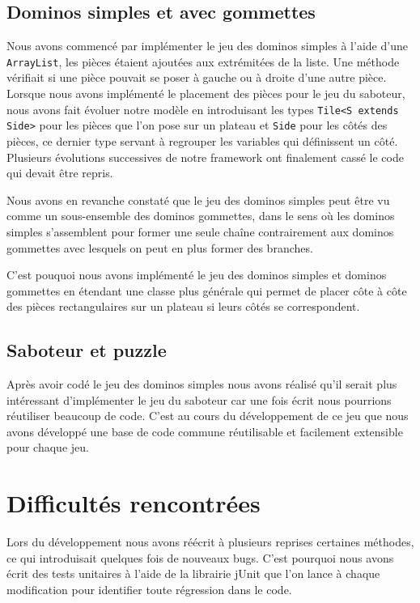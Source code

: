 \documentclass[a4paper, 11pt, DIV=9]{scrartcl}
\begin{document}
\subsection{Dominos simples et avec gommettes}
Nous avons commencé par implémenter le jeu des dominos simples à l'aide d'une
\texttt{ArrayList}, les pièces étaient ajoutées aux extrémitées de la liste. Une
méthode vérifiait si une pièce pouvait se poser à gauche ou à droite d'une autre
pièce. Lorsque nous avons implémenté le placement des pièces pour le jeu du
saboteur, nous avons fait évoluer notre modèle en introduisant les types \texttt{Tile<S
extends Side>} pour les pièces que l'on pose sur un plateau et \texttt{Side}
pour les côtés des pièces, ce dernier type servant à regrouper les variables qui
définissent un côté. Plusieurs évolutions successives de notre framework ont
finalement cassé le code qui devait être repris.

Nous avons en revanche constaté que le jeu des dominos simples peut être vu
comme un sous-ensemble des dominos gommettes, dans le sens où les dominos
simples s'assemblent pour former une seule chaîne contrairement aux dominos
gommettes avec lesquels on peut en plus former des branches.

C'est pouquoi nous avons implémenté le jeu des dominos simples et dominos
gommettes en étendant une classe plus générale qui permet de placer côte à côte
des pièces rectangulaires sur un plateau si leurs côtés se correspondent.

%


\subsection{Saboteur et puzzle}

Après avoir codé le jeu des dominos simples nous avons réalisé qu'il serait plus
intéressant d'implémenter le jeu du saboteur car une fois écrit nous pourrions
réutiliser beaucoup de code. C'est au cours du développement de ce jeu que nous
avons développé une base de code commune réutilisable et facilement extensible
pour chaque jeu.



\section{Difficultés rencontrées}

Lors du développement nous avons réécrit à plusieurs reprises certaines
méthodes, ce qui introduisait quelques fois de nouveaux bugs. C'est pourquoi
nous avons écrit des tests unitaires à l'aide de la librairie jUnit que l'on lance à
chaque modification pour identifier toute régression dans le code.
\end{document}

